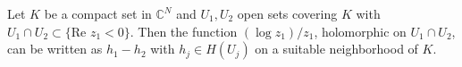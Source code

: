 
Let $K$ be a compact set in $\mathbb{C}^N$ and $U_1, U_2$ open sets covering $K$ with $U_1 \cap U_2 \subset \{\text{Re } z_1 < 0\}$. Then the function $(\log z_1)/z_1$, holomorphic on $U_1 \cap U_2$, can be written as $h_1 - h_2$ with $h_j \in H(U_j)$ on a suitable neighborhood of $K$.
